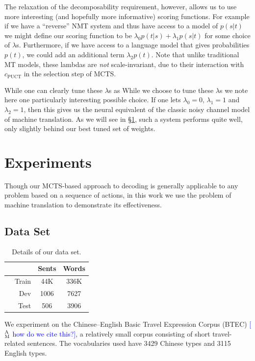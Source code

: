 \documentclass[11pt,a4paper]{article}
\newcommand{\ensuretext}[1]{#1}
\newcommand{\mycomment}[3]{\ensuretext{\textcolor{#3}{[#1 #2]}}}
\newcommand{\ammarker}{\ensuretext{\textcolor{blue}{\ensuremath{^{\textsc{A}}_{\textsc{M}}}}}}
\newcommand{\am}[1]{\mycomment{\ammarker}{#1}{blue}}
\begin{document}
The relaxation of the decomposability requirement, however, allows us to use
more interesting (and hopefully more informative) scoring functions. For
example if we have a ``reverse'' NMT system and thus have access to a model of
$p(s|t)$ we might define our scoring function to be $\lambda_0 p(t|s) +
\lambda_1 p(s|t)$ for some choice of $\lambda$s. Furthermore, if we have access
to a language model that gives probabilities $p(t)$, we could add an additional
term $\lambda_2 p(t)$.
Note that unlike traditional MT models, these lambdas are \emph{not} scale-invariant,
due to their interaction with $c_\text{PUCT}$ in the selection step of MCTS.

While one can clearly tune these $\lambda$s as While we choose to tune these
$\lambda$s we note here one particularly interesting possible choice. If one
lets $\lambda_0 = 0$, $\lambda_1 = 1$ and $\lambda_2 = 1$, then this gives us
the neural equivalent of the classic noisy channel model of machine
translation. As we will see in \S\ref{sec:experiments}, such a system performs
quite well, only slightly behind our best tuned set of weights.

\section{Experiments}
\label{sec:experiments}
Though our MCTS-based approach to decoding is generally applicable to any
problem based on a sequence of actions, in this work we use the problem
of machine translation to demonstrate its effectiveness.

\subsection{Data Set}
\begin{table}
\centering
\begin{tabular}{r r c c}
\toprule
& & Sents & Words \\
\midrule
 & Train & 44K & 336K \\
& Dev & 1006 & 7627 \\
& Test & 506 & 3906 \\
\bottomrule
\end{tabular}
\caption{Details of our data set.}
\label{tab:data_sets}
\end{table}

We experiment on the Chinese--English Basic Travel Expression Corpus (BTEC)
\am{how do we cite this?},
a relatively small corpus consisting of short travel-related sentences.
The vocabularies used have 3429 Chinese types and 3115 English types.
\end{document}
